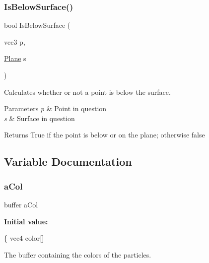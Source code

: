 \subsubsection{\texorpdfstring{Is\+Below\+Surface()}{IsBelowSurface()}}
{\footnotesize\ttfamily bool Is\+Below\+Surface (\begin{DoxyParamCaption}\item[{vec3}]{p,  }\item[{\hyperlink{struct_plane}{Plane}}]{s }\end{DoxyParamCaption})}



Calculates whether or not a point is below the surface. 


\begin{DoxyParams}{Parameters}
{\em p} & Point in question \\
\hline
{\em s} & Surface in question \\
\hline
\end{DoxyParams}
\begin{DoxyReturn}{Returns}
True if the point is below or on the plane; otherwise false 
\end{DoxyReturn}


\subsection{Variable Documentation}
\mbox{\label{bouncing__particles_8comp_a41cc0a0d722413ed428da01e38311893}} 
\subsubsection{\texorpdfstring{a\+Col}{aCol}}
{\footnotesize\ttfamily buffer a\+Col}

{\bfseries Initial value\+:}
\begin{DoxyCode}
\{
    vec4 color[]
\end{DoxyCode}


The buffer containing the colors of the particles. 

\mbox{\label{bouncing__particles_8comp_a9f39e8aaa860ed0953f27908a3b221d0}} 
